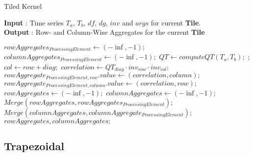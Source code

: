 \begin{algorithm}
    \caption{Tiled Kernel}\label{alg:Tiled}
        \hspace*{\algorithmicindent} \textbf{Input} : Time series $T_a$, $T_b$, $df$, $dg$, $inv$ and $args$ for current \textbf{Tile}.\\
        \hspace*{\algorithmicindent} \textbf{Output} : Row- and Column-Wise Aggregates for the current \textbf{Tile}
        \begin{algorithmic}[1]
                \State $rowAggregates_{ProcessingElement} \gets (-\inf, -1);$
                \State $columnAggregates_{ProcessingElement} \gets (-\inf, -1);$
                    \State $QT \gets computeQT(T_a, T_b);$
                        ;
                            \State $col \gets row + diag;$
                            \State $correlation \gets QT_{diag} \cdot inv_{row} \cdot inv_{col};$
                                \State $rowAggregate_{ProcessingElement, row}.value \gets (correlation, column);$
                            \EndIf
                                \State $rowAggregate_{ProcessingElement, column}.value \gets (correlation, row);$
                            \EndIf
                        \EndFor
                    \EndFor
                \EndIf
            \EndFor
            \State $rowAggregates \gets (-\inf, -1);$
            \State $columnAggregates \gets (-\inf, -1);$
                \State $Merge(rowAggregates, rowAggregates_{ProcessingElement});$
                \State $Merge(columnAggregates, columnAggregate_{ProcessingElement});$
            \EndFor
            \Return $rowAggregates, columnAggregates;$

        \end{algorithmic}
\end{algorithm}
    

\subsection{Trapezoidal}

